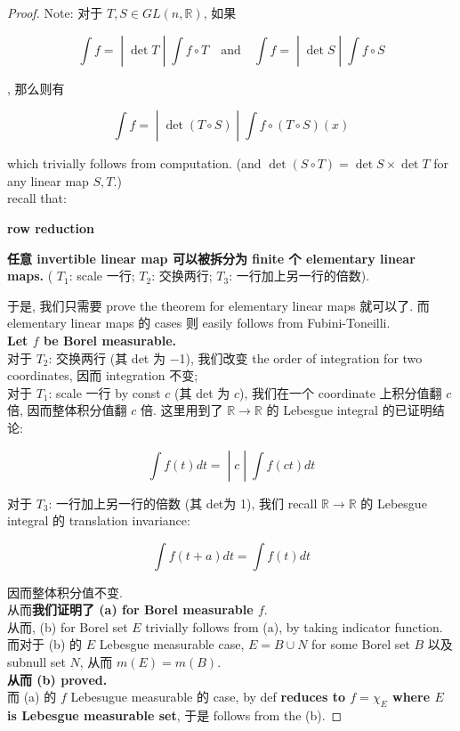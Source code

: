 \documentclass{qlnotes-export}
\begin{document}
\begin{proof}

Note: 对于 \(T,S \in GL(n,{\mathbb{R}})\), 如果

\[\left. \int f = \middle| \det T \middle| \int f \circ T\quad\text{and}\quad\int f = \middle| \det S \middle| \int f \circ S \right.\]

, 那么则有

\[\left. \int f = \middle| \det(T \circ S) \middle| \int f \circ (T \circ S)(x) \right.\]

which trivially follows from computation. (and \(\det(S \circ T) = \det S \times \det T\) for any linear map \(S,T\).)\\
recall that:

\begin{lemma}{\protect{}\label{kn-row-reduction}{\textbf{row reduction}}}

\textbf{任意 invertible linear map 可以被拆分为 finite 个 elementary linear maps.} ( \(T_{1}\): scale 一行; \(T_{2}\): 交换两行; \(T_{3}\): 一行加上另一行的倍数).

\end{lemma}

于是, 我们只需要 prove the theorem for elementary linear maps 就可以了. 而 elementary linear maps 的 cases 则 easily follows from Fubini-Toneilli.\\
\textbf{Let \(f\) be Borel measurable.}\\
对于 \(T_{2}\): 交换两行 (其 det 为 −1), 我们改变 the order of integration for two coordinates, 因而 integration 不变;\\
对于 \(T_{1}\): scale 一行 by const \(c\) (其 det 为 \(c\)), 我们在一个 coordinate 上积分值翻 \(c\) 倍, 因而整体积分值翻 \(c\) 倍. 这里用到了 \({\mathbb{R}}\rightarrow{\mathbb{R}}\) 的 Lebesgue integral 的已证明结论:

\[\left. \int f(t) dt = \middle| c \middle| \int f(ct) dt \right.\]

对于 \(T_{3}\): 一行加上另一行的倍数 (其 det为 1), 我们 recall \({\mathbb{R}}\rightarrow{\mathbb{R}}\) 的 Lebesgue integral 的 translation invariance:

\[\int f(t + a) dt = \int f(t) dt\]

因而整体积分值不变.\\
从而\textbf{我们证明了 (a) for Borel measurable \(f\)}.\\
从而, (b) for Borel set \(E\) trivially follows from (a), by taking indicator function.\\
而对于 (b) 的 \(E\) Lebesgue measurable case, \(E = B \cup N\) for some Borel set \(B\) 以及 subnull set \(N\), 从而 \(m(E) = m(B)\).\\
\textbf{从而 (b) proved.}\\
而 (a) 的 \(f\) Lebesugue measurable 的 case, by def \textbf{reduces to \(f = \chi_{E}\) where \(E\) is Lebesgue measurable set}, 于是 follows from the (b).

\end{proof}
\end{document}
